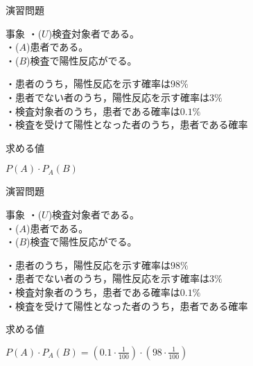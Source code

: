 \documentclass[aspectratio=169, dvipdfmx, 11pt]{beamer}
\begin{document}
\begin{frame}{演習問題}

\begin{alertblock}{事象}
・($U$)検査対象者である。\\
・($A$)患者である。\\
・($B$)検査で陽性反応がでる。\\
\end{alertblock}

・患者のうち，陽性反応を示す確率は$98\%$\\
・患者でない者のうち，陽性反応を示す確率は$3\%$\\
・検査対象者のうち，患者である確率は$0.1\%$\\
・検査を受けて陽性となった者のうち，患者である確率

\begin{alertblock}{求める値}
\begin{center}
$P(A)\cdot P_A(B)$
\end{center}
\end{alertblock}

\end{frame}


\begin{frame}{演習問題}

\begin{alertblock}{事象}
・($U$)検査対象者である。\\
・($A$)患者である。\\
・($B$)検査で陽性反応がでる。\\
\end{alertblock}

・患者のうち，陽性反応を示す確率は$98\%$\\
・患者でない者のうち，陽性反応を示す確率は$3\%$\\
・検査対象者のうち，患者である確率は$0.1\%$\\
・検査を受けて陽性となった者のうち，患者である確率

\begin{alertblock}{求める値}
\begin{center}
$P(A)\cdot P_A(B)=(0.1\cdot \frac{1}{100})\cdot (98\cdot \frac{1}{100})$
\end{center}
\end{alertblock}

\end{frame}
\end{document}
